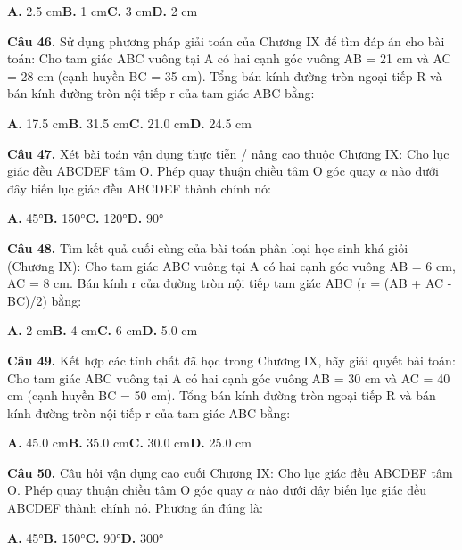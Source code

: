 \documentclass[11pt,a4paper]{article}
\begin{document}
\hspace*{1.5em}\textbf{A.} 2.5 cm\quad\quad \textbf{B.} 1 cm\quad\quad \textbf{C.} 3 cm\quad\quad \textbf{D.} 2 cm\par\vspace{2pt}
\textbf{\color{primary} Câu 46.} Sử dụng phương pháp giải toán của Chương IX để tìm đáp án cho bài toán: Cho tam giác ABC vuông tại A có hai cạnh góc vuông AB = 21 cm và AC = 28 cm (cạnh huyền BC = 35 cm). Tổng bán kính đường tròn ngoại tiếp R và bán kính đường tròn nội tiếp r của tam giác ABC bằng:\par
\hspace*{1.5em}\textbf{A.} 17.5 cm\quad\quad \textbf{B.} 31.5 cm\quad\quad \textbf{C.} 21.0 cm\quad\quad \textbf{D.} 24.5 cm\par\vspace{2pt}
\textbf{\color{primary} Câu 47.} Xét bài toán vận dụng thực tiễn / nâng cao thuộc Chương IX: Cho lục giác đều ABCDEF tâm O. Phép quay thuận chiều tâm O góc quay $\alpha$ nào dưới đây biến lục giác đều ABCDEF thành chính nó:\par
\hspace*{1.5em}\textbf{A.} 45°\quad\quad \textbf{B.} 150°\quad\quad \textbf{C.} 120°\quad\quad \textbf{D.} 90°\par\vspace{2pt}
\textbf{\color{primary} Câu 48.} Tìm kết quả cuối cùng của bài toán phân loại học sinh khá giỏi (Chương IX): Cho tam giác ABC vuông tại A có hai cạnh góc vuông AB = 6 cm, AC = 8 cm. Bán kính r của đường tròn nội tiếp tam giác ABC (r = (AB + AC - BC)/2) bằng:\par
\hspace*{1.5em}\textbf{A.} 2 cm\quad\quad \textbf{B.} 4 cm\quad\quad \textbf{C.} 6 cm\quad\quad \textbf{D.} 5.0 cm\par\vspace{2pt}
\textbf{\color{primary} Câu 49.} Kết hợp các tính chất đã học trong Chương IX, hãy giải quyết bài toán: Cho tam giác ABC vuông tại A có hai cạnh góc vuông AB = 30 cm và AC = 40 cm (cạnh huyền BC = 50 cm). Tổng bán kính đường tròn ngoại tiếp R và bán kính đường tròn nội tiếp r của tam giác ABC bằng:\par
\hspace*{1.5em}\textbf{A.} 45.0 cm\quad\quad \textbf{B.} 35.0 cm\quad\quad \textbf{C.} 30.0 cm\quad\quad \textbf{D.} 25.0 cm\par\vspace{2pt}
\textbf{\color{primary} Câu 50.} Câu hỏi vận dụng cao cuối Chương IX: Cho lục giác đều ABCDEF tâm O. Phép quay thuận chiều tâm O góc quay $\alpha$ nào dưới đây biến lục giác đều ABCDEF thành chính nó. Phương án đúng là:\par
\hspace*{1.5em}\textbf{A.} 45°\quad\quad \textbf{B.} 150°\quad\quad \textbf{C.} 90°\quad\quad \textbf{D.} 300°\par\vspace{2pt}
\end{document}

